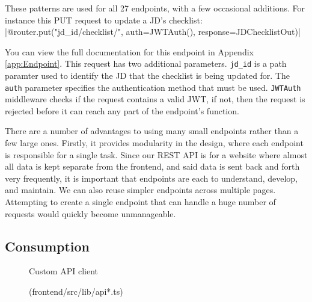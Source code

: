 These patterns are used for all 27 endpoints, with a few occasional additions. For instance this PUT request to update a JD's checklist:
|@router.put("{jd_id}/checklist/", auth=JWTAuth(), response=JDChecklistOut)|

You can view the full documentation for this endpoint in Appendix \ref{app:Endpoint}. This request has two additional parameters. \texttt{jd\_id} is a path paramter used to identify the JD that the checklist is being updated for. The \texttt{auth} parameter specifies the authentication method that must be used. \texttt{JWTAuth} middleware checks if the request contains a valid JWT, if not, then the request is rejected before it can reach any part of the endpoint's function.

There are a number of advantages to using many small endpoints rather than a few large ones. Firstly, it provides modularity in the design, where each endpoint is responsible for a single task. Since our REST API is for a website where almost all data is kept separate from the frontend, and said data is sent back and forth very frequently, it is important that endpoints are each to understand, develop, and maintain. We can also reuse simpler endpoints across multiple pages. Attempting to create a single endpoint that can handle a huge number of requests would quickly become unmanageable.


\subsection{Consumption}
\begin{figure}[h]
\centering
{}
\vspace{-20pt}
\caption{Custom API client}
\vspace{-10pt}
\caption*{(frontend/src/lib/api*.ts)}
\label{fig:api-lib}
\vspace{-5pt}
\end{figure}

